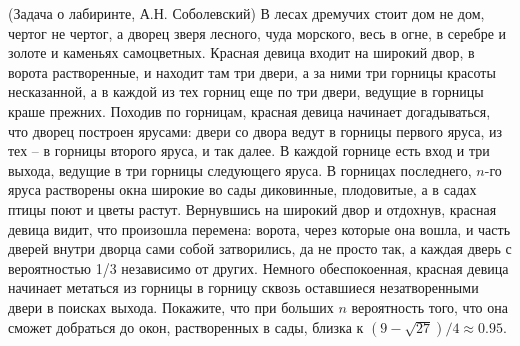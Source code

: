 \begin{problem}(Задача о лабиринте, А.Н. Соболевский)
В лесах дремучих стоит дом не дом, чертог не чертог, а дворец зверя лесного, чуда морского, весь в огне, в серебре и золоте и каменьях самоцветных. Красная девица входит на широкий двор, в ворота растворенные, и находит там три двери, а за ними три горницы красоты несказанной, а в каждой из тех горниц еще по три двери, ведущие в горницы краше прежних.
Походив по горницам, красная девица начинает догадываться, что дворец построен ярусами: двери со двора ведут в горницы первого яруса, из тех -- в горницы второго яруса, и так далее. В каждой горнице есть вход и три выхода, ведущие в три горницы следующего яруса. В горницах последнего, $n$-го яруса растворены окна широкие во сады диковинные, плодовитые, а в садах птицы поют и цветы растут.
Вернувшись на широкий двор и отдохнув, красная девица видит, что произошла перемена: ворота, через которые она вошла, и часть дверей внутри дворца сами собой затворились,
да не просто так, а каждая дверь с вероятностью 1/3 независимо от других. Немного обеспокоенная, красная девица начинает метаться из горницы в горницу сквозь оставшиеся незатворенными двери в поисках выхода. Покажите, что при больших $n$ вероятность того, что
она сможет добраться до окон, растворенных в сады, близка к $(9 - \sqrt{27}) / 4 \approx 0.95$.
\end{problem}


